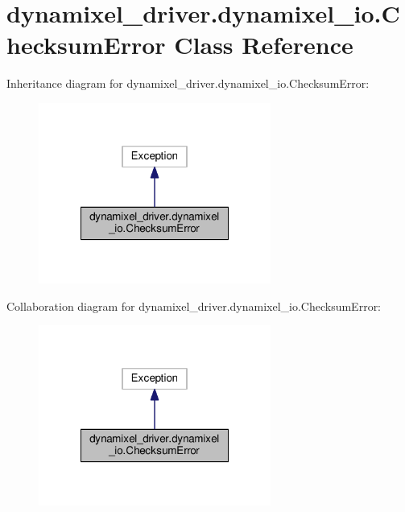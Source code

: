\hypertarget{classdynamixel__driver_1_1dynamixel__io_1_1_checksum_error}{}\section{dynamixel\+\_\+driver.\+dynamixel\+\_\+io.\+Checksum\+Error Class Reference}
\label{classdynamixel__driver_1_1dynamixel__io_1_1_checksum_error}


Inheritance diagram for dynamixel\+\_\+driver.\+dynamixel\+\_\+io.\+Checksum\+Error\+:
\nopagebreak
\begin{figure}[H]
\begin{center}
\leavevmode
\includegraphics[width=216pt]{d6/dad/classdynamixel__driver_1_1dynamixel__io_1_1_checksum_error__inherit__graph}
\end{center}
\end{figure}


Collaboration diagram for dynamixel\+\_\+driver.\+dynamixel\+\_\+io.\+Checksum\+Error\+:
\nopagebreak
\begin{figure}[H]
\begin{center}
\leavevmode
\includegraphics[width=216pt]{d2/d50/classdynamixel__driver_1_1dynamixel__io_1_1_checksum_error__coll__graph}
\end{center}
\end{figure}
